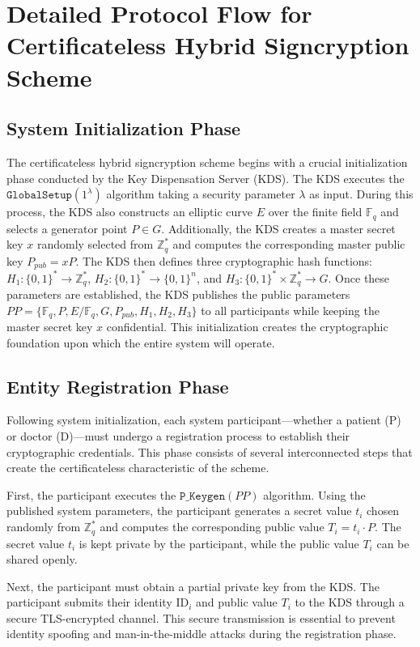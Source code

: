 \documentclass[10pt]{article}
\begin{document}
\section{Detailed Protocol Flow for Certificateless Hybrid Signcryption Scheme}

\subsection{System Initialization Phase}
The certificateless hybrid signcryption scheme begins with a crucial initialization phase conducted by the Key Dispensation Server (KDS). The KDS executes the $\texttt{GlobalSetup}(1^\lambda)$ algorithm taking a security parameter $\lambda$ as input. During this process, the KDS also constructs an elliptic curve $E$ over the finite field $\mathbb{F}_q$ and selects a generator point $P \in G$. Additionally, the KDS creates a master secret key $x$ randomly selected from $\mathbb{Z}_q^*$ and computes the corresponding master public key $P_{pub} = xP$. The KDS then defines three cryptographic hash functions: $H_1: \{0,1\}^* \rightarrow \mathbb{Z}_q^*$, $H_2: \{0,1\}^* \rightarrow \{0,1\}^n$, and $H_3: \{0,1\}^* \times \mathbb{Z}_q^* \rightarrow G$. Once these parameters are established, the KDS publishes the public parameters $PP = \{\mathbb{F}_q, P, E/\mathbb{F}_q, G, P_{pub}, H_1, H_2, H_3\}$ to all participants while keeping the master secret key $x$ confidential. This initialization creates the cryptographic foundation upon which the entire system will operate.

\subsection{Entity Registration Phase}
Following system initialization, each system participant—whether a patient (P) or doctor (D)—must undergo a registration process to establish their cryptographic credentials. This phase consists of several interconnected steps that create the certificateless characteristic of the scheme.

First, the participant executes the $\texttt{P\_Keygen}(PP)$ algorithm. Using the published system parameters, the participant generates a secret value $t_i$ chosen randomly from $\mathbb{Z}_q^*$ and computes the corresponding public value $T_i = t_i \cdot P$. The secret value $t_i$ is kept private by the participant, while the public value $T_i$ can be shared openly.

Next, the participant must obtain a partial private key from the KDS. The participant submits their identity $\text{ID}_i$ and public value $T_i$ to the KDS through a secure TLS-encrypted channel. This secure transmission is essential to prevent identity spoofing and man-in-the-middle attacks during the registration phase.
\end{document}
